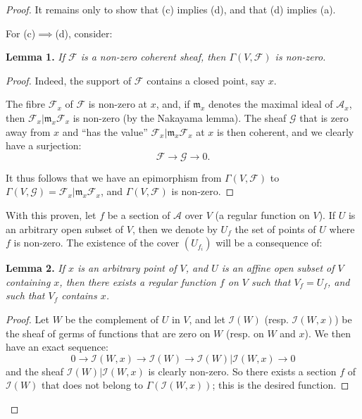 \documentclass{article}
\newenvironment{itenv}[1]
  {\par\medskip\noindent\textbf{#1.}\itshape}
  {\medskip}
\newcommand{\scr}[1]{{\mathscr{#1}}}
\newcommand{\oldpage}[1]{\marginpar{\footnotesize$\Big\vert$ \textit{p.~#1}}}
\begin{document}
\begin{proof}
  It remains only to show that (c) implies (d), and that (d) implies (a).

  \bigskip
  For (c)$\implies$(d), consider:
  \begin{itenv}{Lemma 1}
  \label{lemma1}
    If $\scr{F}$ is a non-zero coherent sheaf, then $\Gamma(V,\scr{F})$ is non-zero.
  \end{itenv}

  \begin{proof}
    Indeed, the support of $\scr{F}$ contains a closed point, say $x$.

    The fibre $\scr{F}_x$ of $\scr{F}$ is non-zero at $x$, and, if $\mathfrak{m}_x$ denotes the maximal ideal of $\scr{A}_x$, then $\scr{F}_x|\mathfrak{m}_x\scr{F}_x$ is non-zero (by the Nakayama lemma).
    The sheaf $\scr{G}$ that is zero away from $x$ and ``has the value'' $\scr{F}_x|\mathfrak{m}_x\scr{F}_x$ at $x$ is then coherent, and we clearly have a surjection:
    \[
      \scr{F}\to\scr{G}\to0.
    \]

    It thus follows that we have an epimorphism from $\Gamma(V,\scr{F})$ to $\Gamma(V,\scr{G}) = \scr{F}_x|\mathfrak{m}_x\scr{F}_x$, and $\Gamma(V,\scr{F})$ is non-zero.
  \end{proof}

  With this proven, let $f$ be a section of $\scr{A}$ over $V$ (a regular function on $V$).
  If $U$ is an arbitrary open subset of $V$, then we denote by $U_f$ the set of points of $U$ where $f$ is non-zero.
  The existence of the cover $(U_{f_i})$ will be a consequence of:
  \begin{itenv}{Lemma 2}
  \label{lemma2}
\oldpage{2-06}
    If $x$ is an arbitrary point of $V$, and $U$ is an affine open subset of $V$ containing $x$, then there exists a regular function $f$ on $V$ such that $V_f=U_f$, and such that $V_f$ contains $x$.
  \end{itenv}

  \begin{proof}
    Let $W$ be the complement of $U$ in $V$, and let $\scr{I}(W)$ (resp. $\scr{I}(W,x)$) be the sheaf of germs of functions that are zero on $W$ (resp. on $W$ and $x$).
    We then have an exact sequence:
    \[
      0 \to \scr{I}(W,x) \to \scr{I}(W) \to \scr{I}(W)|\scr{I}(W,x) \to 0
    \]
    and the sheaf $\scr{I}(W)|\scr{I}(W,x)$ is clearly non-zero.
    So there exists a section $f$ of $\scr{I}(W)$ that does not belong to $\Gamma(\scr{I}(W,x))$;
    this is the desired function.
  \end{proof}


\end{proof}
\end{document}

